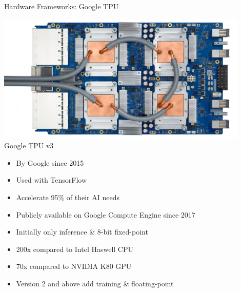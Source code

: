 \begin{frame}{Hardware Frameworks: Google TPU}
	\begin{minipage}{0.4\textwidth}
		\centering
		\includegraphics[width=0.9\textwidth]{../Images/Hardware/tpu-v3.png}\\
		Google TPU v3
	\end{minipage}%
	\begin{minipage}{0.6\textwidth}
		\begin{itemize}
			\item By Google since 2015
			\item Used with TensorFlow
			\item Accelerate 95\% of their AI needs
			\item Publicly available on Google Compute Engine since 2017
			\item Initially only inference \& 8-bit fixed-point
			\item 200x compared to Intel Haswell CPU
			\item 70x compared to NVIDIA K80 GPU
			\item Version 2 and above add training \& floating-point
		\end{itemize}
	\end{minipage}
\end{frame}


